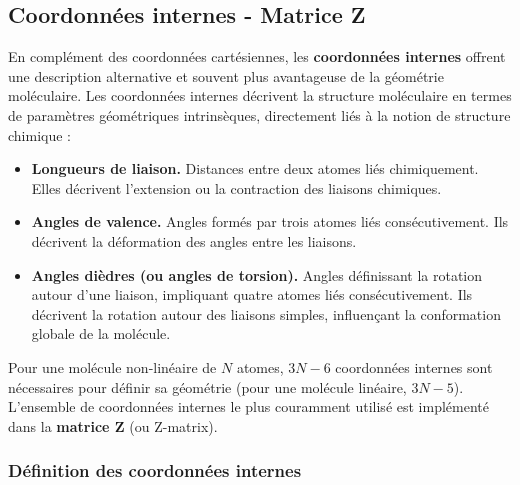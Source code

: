 \documentclass[12pt,a4paper]{article} %
\numberwithin{equation}{section} %
\numberwithin{figure}{section} %
\numberwithin{table}{section} %
\begin{document}
\subsection{Coordonnées internes - Matrice Z}

En complément des coordonnées cartésiennes, les \textbf{coordonnées internes} offrent une description alternative et souvent plus avantageuse de la géométrie moléculaire. Les coordonnées internes décrivent la structure moléculaire en termes de paramètres géométriques intrinsèques, directement liés à la notion de structure chimique :

\begin{itemize}
 \item \textbf{Longueurs de liaison.} Distances entre deux atomes liés chimiquement. Elles décrivent l'extension ou la contraction des liaisons chimiques.
 \item \textbf{Angles de valence.} Angles formés par trois atomes liés consécutivement. Ils décrivent la déformation des angles entre les liaisons.
 \item \textbf{Angles dièdres (ou angles de torsion).} Angles définissant la rotation autour d'une liaison, impliquant quatre atomes liés consécutivement. Ils décrivent la rotation autour des liaisons simples, influençant la conformation globale de la molécule.
\end{itemize}

Pour une molécule non-linéaire de $N$ atomes, $3N-6$ coordonnées internes sont nécessaires pour définir sa géométrie (pour une molécule linéaire, $3N-5$). L'ensemble de coordonnées internes le plus couramment utilisé est implémenté dans la \textbf{matrice Z} (ou Z-matrix).

\subsubsection{Définition des coordonnées internes}
\end{document}
